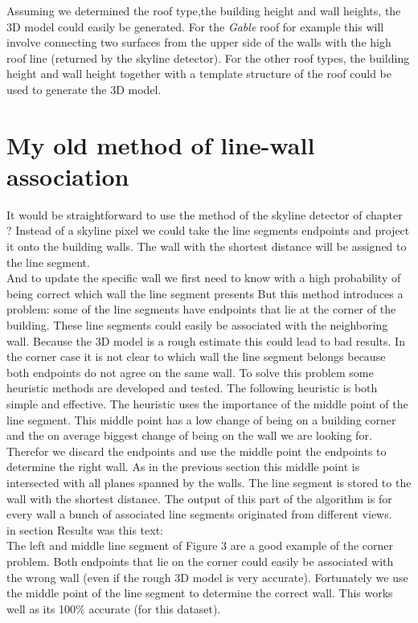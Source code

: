 Assuming we determined the roof type,the building height and wall heights, the 3D model could 
easily be generated. For the \emph{Gable} roof for example this will involve
connecting two surfaces from the upper side of the walls with the high roof line (returned by the
skyline detector). For the other roof types, the building height and wall
height together with a template structure of the roof could be used to generate the 3D
model.


\section{My old method of line-wall association}
\label{sec:oldmethodlwa}
It would be straightforward to use the method of the skyline detector of
chapter ?%
Instead of a skyline pixel we could take the line segments
endpoints and project it onto the building walls. The wall with the shortest
distance will be assigned to the line segment.\\

And to update the specific wall we first need to know with a high probability of being correct which wall the line segment presents
But this method introduces a problem: some of the line segments have endpoints that lie at the corner of the building. These line segments could easily be associated with the neighboring wall. Because the 3D model is a rough estimate this could lead to bad results.
In the corner case it is not clear to which wall the line segment belongs because both endpoints do not agree on the same wall. To solve this problem some heuristic methods are developed and tested. The following heuristic is both simple and effective.
The heuristic uses the importance of the middle point of the line segment. This middle point has a low change of being on a building corner and the on average biggest change of being on the wall we are looking for.
Therefor we discard the endpoints and use the middle point the endpoints to determine the right wall.
As in the previous section %
this middle point is intersected with all planes spanned by the walls. The line segment is stored to the wall with the shortest distance.
The output of this part of the algorithm is for every wall a bunch of associated line segments originated from different views.\\

in section Results was this text:\\
The left and middle line segment of Figure 3 %
are
a good example of the corner problem. Both endpoints that lie on the corner could easily be associated
with the wrong wall (even if the rough 3D model is very accurate). Fortunately
we use the middle point of the line segment to determine the correct wall. This
works well as its 100\% accurate (for this dataset).


